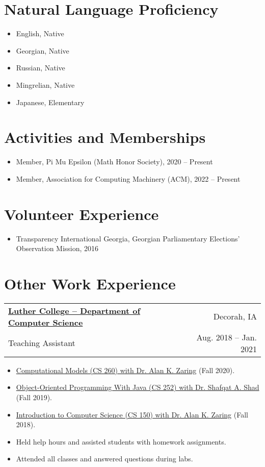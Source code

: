 \documentclass{article}
\makeatletter
\newcommand{\entry}[4]{
    \vspace{-1pt}
    \item
    \begin{tabular*}{0.98\textwidth}[t]{l@{\extracolsep{\fill}}r}
        \textbf{#1} & #2\\
        \small#3 & \small #4\\
    \end{tabular*}\vspace{-4pt}
}
\newcommand{\entriesbegin}{\begin{itemize}[leftmargin=*]}
\newcommand{\entriesend}{\end{itemize}}
\newcommand{\entryitemsstart}{\begin{itemize}[label=\(\circ\)]}
\newcommand{\entryitemsend}{\end{itemize}\vspace{-4pt}}
\newcommand{\entryitem}[1]{\item\small{#1}}
\newcommand{\entrysubitem}[1]{\item[\(\circ\)]\small{#1}\vspace{-4pt}}
\makeatother
\begin{document}
\section{Natural Language Proficiency}

\entriesbegin
\entrysubitem{English, Native}
\entrysubitem{Georgian, Native}
\entrysubitem{Russian, Native}
\entrysubitem{Mingrelian, Native}
\entrysubitem{Japanese, Elementary}
\entriesend



\section{Activities and Memberships}

\entriesbegin
\entrysubitem{Member, Pi Mu Epsilon (Math Honor Society), 2020 -- Present}
\entrysubitem{Member, Association for Computing Machinery (ACM), 2022 -- Present}
\entriesend



\section{Volunteer Experience}

\entriesbegin
\entrysubitem{Transparency International Georgia, Georgian Parliamentary Elections' Observation Mission, 2016}
\entriesend



\section{Other Work Experience}

\entry{\href{https://www.luther.edu/}{Luther College -- Department of Computer Science}}{Decorah, IA}{Teaching Assistant}{Aug. 2018 -- Jan. 2021}
\entryitemsstart
    \entryitem{\href{https://www.luther.edu/catalog/curriculum/computer-science/}{Computational Models (CS 260) with Dr. Alan K. Zaring} (Fall 2020).}
    \entryitem{\href{https://www.luther.edu/catalog/curriculum/computer-science/}{Object-Oriented Programming With Java (CS 252) with Dr. Shafqat A. Shad} (Fall 2019).}
    \entryitem{\href{https://www.luther.edu/catalog/curriculum/computer-science/}{Introduction to Computer Science (CS 150) with Dr. Alan K. Zaring} (Fall 2018).}
    \entryitem{Held help hours and assisted students with homework assignments.}
    \entryitem{Attended all classes and answered questions during labs.}
\entryitemsend
\end{document}
